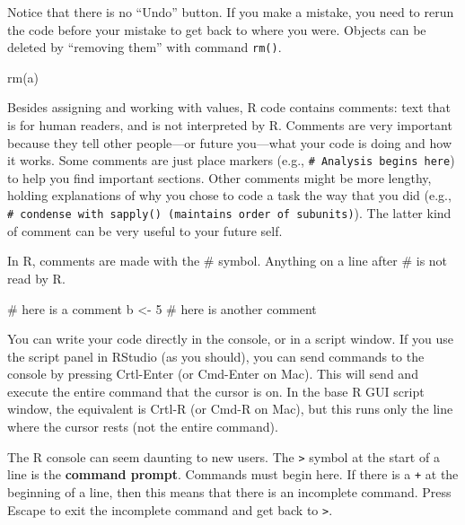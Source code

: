 \documentclass[
  13,
  letterpaper,
]{report}
\newenvironment{Shaded}{\begin{snugshade}}{\end{snugshade}}
\newcommand{\CommentTok}[1]{\textcolor[rgb]{0.37,0.37,0.37}{#1}}
\newcommand{\DecValTok}[1]{\textcolor[rgb]{0.68,0.00,0.00}{#1}}
\newcommand{\FunctionTok}[1]{\textcolor[rgb]{0.28,0.35,0.67}{#1}}
\newcommand{\NormalTok}[1]{\textcolor[rgb]{0.00,0.23,0.31}{#1}}
\newcommand{\OtherTok}[1]{\textcolor[rgb]{0.00,0.23,0.31}{#1}}
\begin{document}
Notice that there is no ``Undo'' button. If you make a mistake, you need
to rerun the code before your mistake to get back to where you were.
Objects can be deleted by ``removing them'' with command \texttt{rm()}.

\begin{Shaded}
\begin{Highlighting}[]
\FunctionTok{rm}\NormalTok{(a)}
\end{Highlighting}
\end{Shaded}

Besides assigning and working with values, R code contains comments:
text that is for human readers, and is not interpreted by R. Comments
are very important because they tell other people---or future you---what
your code is doing and how it works. Some comments are just place
markers (e.g., \texttt{\#\ Analysis\ begins\ here}) to help you find
important sections. Other comments might be more lengthy, holding
explanations of why you chose to code a task the way that you did (e.g.,
\texttt{\#\ condense\ with\ sapply()\ (maintains\ order\ of\ subunits)}).
The latter kind of comment can be very useful to your future self.

In R, comments are made with the \# symbol. Anything on a line after \#
is not read by R.

\begin{Shaded}
\begin{Highlighting}[]
\CommentTok{\# here is a comment}
\NormalTok{b }\OtherTok{\textless{}{-}} \DecValTok{5} \CommentTok{\# here is another comment}
\end{Highlighting}
\end{Shaded}

You can write your code directly in the console, or in a script window.
If you use the script panel in RStudio (as you should), you can send
commands to the console by pressing Crtl-Enter (or Cmd-Enter on Mac).
This will send and execute the entire command that the cursor is on. In
the base R GUI script window, the equivalent is Crtl-R (or Cmd-R on
Mac), but this runs only the line where the cursor rests (not the entire
command).

The R console can seem daunting to new users. The
\texttt{\textgreater{}} symbol at the start of a line is the
\textbf{command prompt}. Commands must begin here. If there is a
\texttt{+} at the beginning of a line, then this means that there is an
incomplete command. Press Escape to exit the incomplete command and get
back to \texttt{\textgreater{}}.
\end{document}
